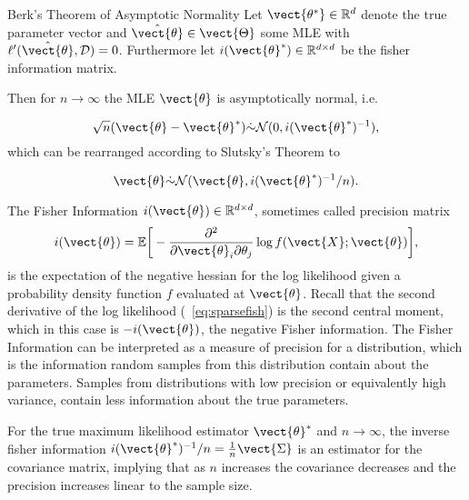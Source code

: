         \begin{threm}{Berk's Theorem of Asymptotic Normality\cite{berk1972consistency}}
            \label{theorem:berk}
            Let $\vect{\theta^*} \in \mathbb{R}^d$ denote the true parameter vector and $\hat{\vect{\theta}} \in \vect{\Theta}$ some MLE with $\ell'(\hat{\vect{\theta}}, \mathcal{D}) = 0$.
            Furthermore let $i(\vect{\theta}^*) \in \mathbb{R}^{d \times d}$ be the fisher information matrix.

            Then for $n \rightarrow \infty$ the MLE $\vect{\theta}$ is asymptotically normal, i.e.

            \begin{equation}
                \sqrt{n}(\vect{\theta} - \vect{\theta}^*) \dot{\sim} \mathcal{N}(0, i(\vect{\theta}^*)^{-1}),
            \end{equation}
            which can be rearranged according to Slutsky's Theorem\cite{casella2002statistical} to

            \begin{equation}
                \vect{\theta} \dot{\sim} \mathcal{N}(\vect{\theta}, i(\vect{\theta}^*)^{-1}/n).
            \end{equation}
        \end{threm}

        The Fisher Information $i(\vect{\theta}) \in \mathbb{R}^{d \times d}$, sometimes called precision matrix
        \begin{equation*}
            i(\vect{\theta}) = \mathbb{E}\bigg[- \frac{\partial^2}{\partial \vect{\theta}_i \partial \theta_j} \log f(\vect{X}; \vect{\theta})\bigg] ,
        \end{equation*} 
        is the expectation of the negative hessian for the log likelihood given a probability density function $f$ evaluated at $\vect{\theta}$.
        Recall that the second derivative of the log likelihood (\eq~\ref{eq:sparsefish}) is the second central moment, which in this case is $-i(\vect{\theta})$, the negative Fisher information.
        The Fisher Information can be interpreted as a measure of precision for a distribution, which is the information random samples from this distribution contain about the parameters.
        Samples from distributions with low precision or equivalently high variance, contain less information about the true parameters.

        For the true maximum likelihood estimator $\vect{\theta}^*$  and $n \rightarrow \infty$, the inverse fisher information $i(\vect{\theta}^*)^{-1}/ n = \frac{1}{n} \vect{\Sigma}$ is an estimator for the covariance matrix, implying that as $n$ increases the covariance decreases and the precision increases linear to the sample size.

